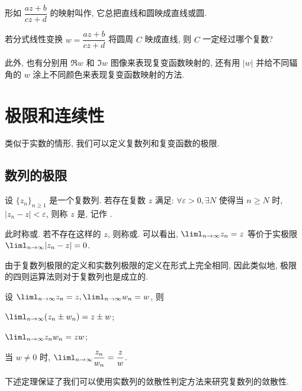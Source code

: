 形如 $\dfrac{az+b}{cz+d}$ 的映射叫作, 它总把直线和圆映成直线或圆.

\begin{exercise}
  若分式线性变换 $w=\dfrac{az+b}{cz+d}$ 将圆周 $C$ 映成直线, 则 $C$ 一定经过哪个复数?
\end{exercise}

此外, 也有分别用 $\Re w$ 和 $\Im w$ 图像来表现复变函数映射的, 还有用 $|w|$ 并给不同辐角的 $w$ 涂上不同颜色来表现复变函数映射的方法.



\section{极限和连续性}

类似于实数的情形, 我们可以定义复数列和复变函数的极限.

\subsection{数列的极限}

\begin{definition}
  设 $\{z_n\}_{n\ge 1}$ 是一个复数列.
  若存在复数 $z$ 满足: $\forall \varepsilon>0,\exists N$ 使得当 $n\ge N$ 时, $|z_n-z|<\varepsilon$, 则称 $z$ 是, 记作 .
\end{definition}
此时称或.
若不存在这样的 $z$, 则称或.
可以看出, $\liml_{n\ra\infty}z_n=z$ 等价于实极限 $\liml_{n\ra\infty}|z_n-z|=0$.

由于复数列极限的定义和实数列极限的定义在形式上完全相同, 因此类似地, 极限的四则运算法则对于复数列也是成立的.

\begin{theorem}
  设 $\liml_{n\ra\infty}z_n=z,\liml_{n\ra\infty}w_n=w$, 则
  \begin{enuma}
    \item $\liml_{n\ra\infty}(z_n\pm w_n)=z\pm w$;
    \item $\liml_{n\ra\infty} z_nw_n=zw$;
    \item 当 $w\neq 0$ 时, $\liml_{n\ra\infty}\dfrac{z_n}{w_n}=\dfrac zw$.
  \end{enuma}
\end{theorem}

下述定理保证了我们可以使用实数列的敛散性判定方法来研究复数列的敛散性.

